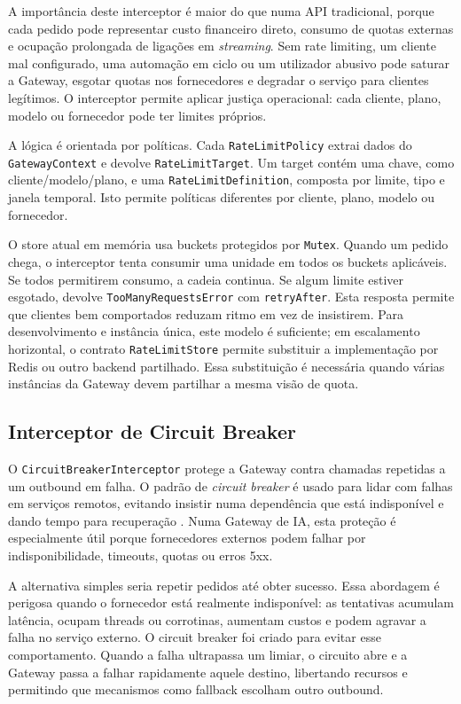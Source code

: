 \documentclass[11pt,a4paper]{report}
\begin{document}
    A importância deste interceptor é maior do que numa API tradicional, porque cada pedido pode representar custo financeiro direto, consumo de quotas externas e ocupação prolongada de ligações em \textit{streaming}. Sem rate limiting, um cliente mal configurado, uma automação em ciclo ou um utilizador abusivo pode saturar a Gateway, esgotar quotas nos fornecedores e degradar o serviço para clientes legítimos. O interceptor permite aplicar justiça operacional: cada cliente, plano, modelo ou fornecedor pode ter limites próprios.

    A lógica é orientada por políticas. Cada \texttt{RateLimitPolicy} extrai dados do \texttt{GatewayContext} e devolve \texttt{RateLimitTarget}. Um target contém uma chave, como cliente/modelo/plano, e uma \texttt{RateLimitDefinition}, composta por limite, tipo e janela temporal. Isto permite políticas diferentes por cliente, plano, modelo ou fornecedor.

    O store atual em memória usa buckets protegidos por \texttt{Mutex}. Quando um pedido chega, o interceptor tenta consumir uma unidade em todos os buckets aplicáveis. Se todos permitirem consumo, a cadeia continua. Se algum limite estiver esgotado, devolve \texttt{TooManyRequestsError} com \texttt{retryAfter}. Esta resposta permite que clientes bem comportados reduzam ritmo em vez de insistirem. Para desenvolvimento e instância única, este modelo é suficiente; em escalamento horizontal, o contrato \texttt{RateLimitStore} permite substituir a implementação por Redis ou outro backend partilhado. Essa substituição é necessária quando várias instâncias da Gateway devem partilhar a mesma visão de quota.

    \subsection{Interceptor de Circuit Breaker}
    O \texttt{CircuitBreakerInterceptor} protege a Gateway contra chamadas repetidas a um outbound em falha. O padrão de \textit{circuit breaker} é usado para lidar com falhas em serviços remotos, evitando insistir numa dependência que está indisponível e dando tempo para recuperação \cite{microsoft_circuit_breaker,itau_circuit_breaker,treinaweb_circuit_breaker}. Numa Gateway de IA, esta proteção é especialmente útil porque fornecedores externos podem falhar por indisponibilidade, timeouts, quotas ou erros 5xx.

    A alternativa simples seria repetir pedidos até obter sucesso. Essa abordagem é perigosa quando o fornecedor está realmente indisponível: as tentativas acumulam latência, ocupam threads ou corrotinas, aumentam custos e podem agravar a falha no serviço externo. O circuit breaker foi criado para evitar esse comportamento. Quando a falha ultrapassa um limiar, o circuito abre e a Gateway passa a falhar rapidamente aquele destino, libertando recursos e permitindo que mecanismos como fallback escolham outro outbound.
\end{document}
